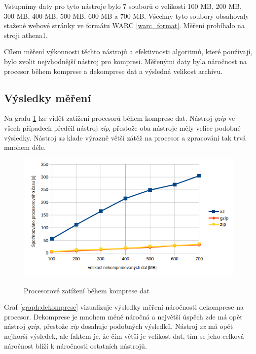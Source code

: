 Vstupnímy daty pro tyto nástroje bylo 7 souborů o velikosti 100 MB, 200 MB, 300 MB,
400 MB, 500 MB, 600 MB a 700 MB. Všechny tyto soubory obsahovaly stažené webové
stránky ve formátu WARC \ref{warc_format}. Měření probíhalo na stroji athena1.

Cílem měření výkonnosti těchto nástrojů a efektivnosti algoritmů, které používají, bylo
zvolit nejvhodnější nástroj pro kompresi. Měřenými daty byla náročnost na procesor
během komprese a dekomprese dat a výsledná velikost archivu.

\subsection{Výsledky měření}
Na grafu \ref{graph:komprese} lze vidět zatížení procesorů během komprese dat.
Nástroj \textit{gzip}  ve všech případech předčil nástroj \textit{zip}, přestože
oba nástroje měly velice podobné výsledky. Nástroj \textit{xz} klade výrazně
větší zátěž na procesor a zpracování tak trvá mnohem déle.

\begin{figure}[H]
    \begin{center}
        \label{graph:komprese}
        \includegraphics[width=1.0\textwidth]{obrazky-figures/graph_komprese.png}
        \caption{Procesorové zatížení během komprese dat}
    \end{center}
\end{figure}

Graf \ref{graph:dekomprese} vizualizuje výsledky měření náročnosti dekomprese na
procesor. Dekomprese je mnohem méně náročná a největší úspěch zde má opět nástroj
\textit{gzip}, přestože \textit{zip} dosahuje podobných výsledků. Nástroj \textit{xz}
má opět nejhorší výsledek, ale faktem je, že čím větší je velikost dat, tím
se jeho celková náročnost blíží k náročnosti ostatních nástrojů.


